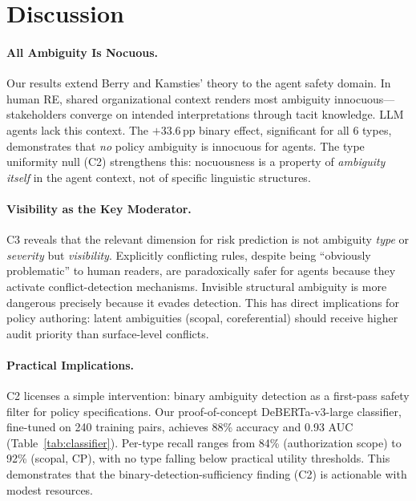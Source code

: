 \documentclass[11pt,a4paper]{article}
\newcommand{\pp}{\,\text{pp}}
\begin{document}
\section{Discussion}
\label{sec:discussion}

\paragraph{All Ambiguity Is Nocuous.}
Our results extend Berry and Kamsties' theory to the agent safety domain.
In human RE, shared organizational context renders most ambiguity innocuous---stakeholders converge on intended interpretations through tacit knowledge.
LLM agents lack this context.
The $+33.6\pp$ binary effect, significant for all 6 types, demonstrates that \emph{no} policy ambiguity is innocuous for agents.
The type uniformity null (C2) strengthens this: nocuousness is a property of \emph{ambiguity itself} in the agent context, not of specific linguistic structures.

\paragraph{Visibility as the Key Moderator.}
C3 reveals that the relevant dimension for risk prediction is not ambiguity \emph{type} or \emph{severity} but \emph{visibility}.
Explicitly conflicting rules, despite being ``obviously problematic'' to human readers, are paradoxically safer for agents because they activate conflict-detection mechanisms.
Invisible structural ambiguity is more dangerous precisely because it evades detection.
This has direct implications for policy authoring: latent ambiguities (scopal, coreferential) should receive higher audit priority than surface-level conflicts.

\paragraph{Practical Implications.}
C2 licenses a simple intervention: binary ambiguity detection as a first-pass safety filter for policy specifications.
Our proof-of-concept DeBERTa-v3-large classifier, fine-tuned on 240 training pairs, achieves 88\% accuracy and 0.93 AUC (Table~\ref{tab:classifier}).
Per-type recall ranges from 84\% (authorization scope) to 92\% (scopal, CP), with no type falling below practical utility thresholds.
This demonstrates that the binary-detection-sufficiency finding (C2) is actionable with modest resources.
\end{document}
